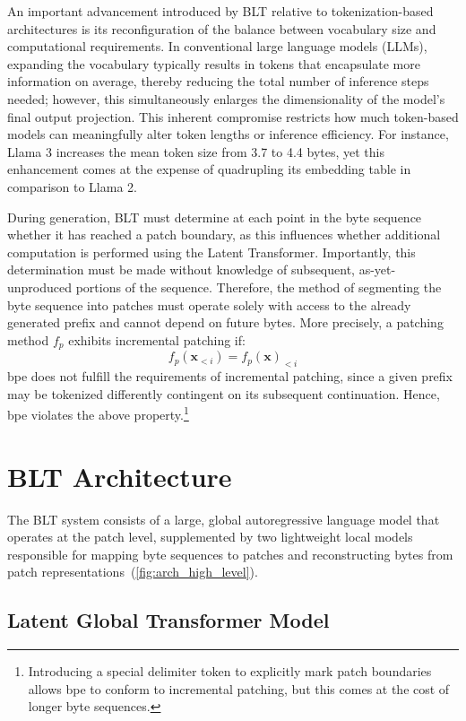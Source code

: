 An important advancement introduced by {\textsc BLT} relative to tokenization-based architectures is its reconfiguration of the balance between vocabulary size and computational requirements. In conventional large language models (LLMs), expanding the vocabulary typically results in tokens that encapsulate more information on average, thereby reducing the total number of inference steps needed; however, this simultaneously enlarges the dimensionality of the model's final output projection. This inherent compromise restricts how much token-based models can meaningfully alter token lengths or inference efficiency. For instance, Llama 3 increases the mean token size from 3.7 to 4.4 bytes, yet this enhancement comes at the expense of quadrupling its embedding table in comparison to Llama 2.

During generation, {\textsc BLT} must determine at each point in the byte sequence whether it has reached a patch boundary, as this influences whether additional computation is performed using the Latent Transformer. Importantly, this determination must be made without knowledge of subsequent, as-yet-unproduced portions of the sequence. Therefore, the method of segmenting the byte sequence into patches must operate solely with access to the already generated prefix and cannot depend on future bytes. More precisely, a patching method $f_p$ exhibits incremental patching if:
$$f_p(\pmb{x}_{<i}) = f_p(\pmb{x})_{<i}$$
bpe does not fulfill the requirements of incremental patching, since a given prefix may be tokenized differently contingent on its subsequent continuation. Hence, bpe violates the above property.\footnote{Introducing a special delimiter token to explicitly mark patch boundaries allows bpe to conform to incremental patching, but this comes at the cost of longer byte sequences.}

\section{{\textsc BLT} Architecture}
\label{section:architecture}
The {\textsc BLT} system consists of a large, global autoregressive language model that operates at the patch level, supplemented by two lightweight local models responsible for mapping byte sequences to patches and reconstructing bytes from patch representations~(\autoref{fig:arch_high_level}).

\subsection{Latent Global Transformer Model}

